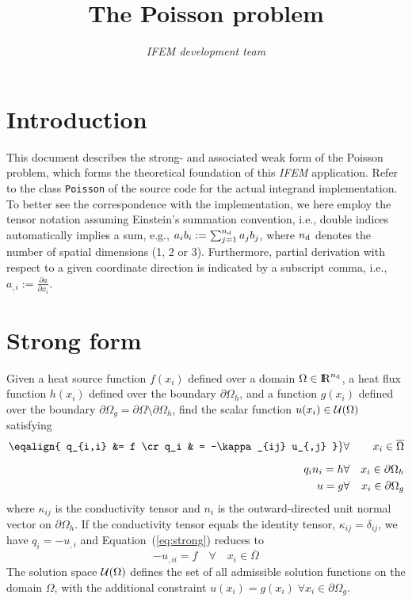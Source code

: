 \documentclass{article}
\title{The Poisson problem}
\author{\sl IFEM development team}
\def\n{{n_{\rm d}}}
\def\R{{\rm I\mkern-4muR}}
\def\deriv#1#2{\frac{\partial#1}{\partial#2}}
\begin{document}
\maketitle

\section{Introduction}

This document describes the strong- and associated weak form of the Poisson
problem, which forms the theoretical foundation of this {\sl IFEM} application.
Refer to the class {\tt Poisson} of the source code for the actual integrand
implementation.
To better see the correspondence with the implementation, we here employ the
tensor notation assuming Einstein's summation convention, i.e., double indices
automatically implies a sum, e.g., $a_ib_i := \sum_{j=1}^\n a_j b_j$, where
$\n$ denotes the number of spatial dimensions (1, 2 or 3).
Furthermore, partial derivation with respect to a given coordinate direction
is indicated by a subscript comma, i.e., $a_{,i} := \deriv{a}{x_i}$.

\section{Strong form}

Given a heat source function $f(x_i)$ defined over a domain $\Omega\in\R^\n$,
a heat flux function $h(x_i)$ defined over the boundary $\partial\Omega_h$,
and a function $g(x_i)$ defined over the boundary
$\partial\Omega_g=\partial\Omega\setminus\partial\Omega_h$,
find the scalar function $u(x_i)\in{\cal U}(\Omega)$ satisfying
%
\begin{eqnarray}
  \label{eq:strong}
  \left.\eqalign{
    q_{i,i} &= f \cr
    q_i & = -\kappa_{ij} u_{,j}
  }\right\} &\forall& x_i\in\overline{\Omega} \\[2mm]
  \label{eq:neumann}
  q_i n_i = h &\forall& x_i\in\partial\Omega_h \\
  u = g &\forall&x_i\in\partial\Omega_g
\end{eqnarray}
%
where $\kappa_{ij}$ is the conductivity tensor and
$n_i$ is the outward-directed unit normal vector on $\partial\Omega_h$.
If the conductivity tensor equals the identity tensor, $\kappa_{ij}=\delta_{ij}$,
we have $q_i=-u_{,i}$ and Equation~(\ref{eq:strong}) reduces to
%
\begin{equation}
  -u_{,ii} = f \quad\forall\quad x_i\in\overline{\Omega}
\end{equation}
%
The solution space ${\cal U}(\Omega)$ defines the set of all admissible solution
functions on the domain $\Omega$, with the additional constraint $u(x_i)=g(x_i)
\;\forall x_i\in\partial\Omega_g$.
\end{document}
